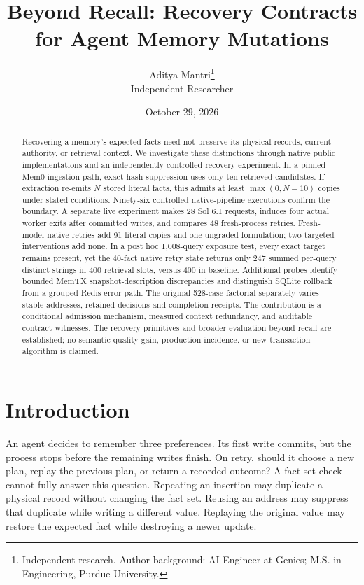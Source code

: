 \documentclass[10pt,letterpaper]{article}
\title{Beyond Recall: Recovery Contracts for Agent Memory Mutations}
\author{Aditya Mantri\thanks{Independent research. Author background: AI Engineer at Genies; M.S. in Engineering, Purdue University.}\\Independent Researcher}
\date{October 29, 2026}
\begin{document}
\maketitle
\begin{abstract}
Recovering a memory's expected facts need not preserve its physical records, current authority, or retrieval context. We investigate these distinctions through native public implementations and an independently controlled recovery experiment. In a pinned Mem0 ingestion path, exact-hash suppression uses only ten retrieved candidates. If extraction re-emits $N$ stored literal facts, this admits at least $\max(0,N-10)$ copies under stated conditions. Ninety-six controlled native-pipeline executions confirm the boundary. A separate live experiment makes 28 Sol 6.1 requests, induces four actual worker exits after committed writes, and compares 48 fresh-process retries. Fresh-model native retries add 91 literal copies and one ungraded formulation; two targeted interventions add none. In a post hoc 1,008-query exposure test, every exact target remains present, yet the 40-fact native retry state returns only 247 summed per-query distinct strings in 400 retrieval slots, versus 400 in baseline. Additional probes identify bounded MemTX snapshot-description discrepancies and distinguish SQLite rollback from a grouped Redis error path. The original 528-case factorial separately varies stable addresses, retained decisions and completion receipts. The contribution is a conditional admission mechanism, measured context redundancy, and auditable contract witnesses. The recovery primitives and broader evaluation beyond recall are established; no semantic-quality gain, production incidence, or new transaction algorithm is claimed.
\end{abstract}

\section{Introduction}
\label{sec:introduction}
An agent decides to remember three preferences. Its first write commits, but the process stops before the remaining writes finish. On retry, should it choose a new plan, replay the previous plan, or return a recorded outcome? A fact-set check cannot fully answer this question. Repeating an insertion may duplicate a physical record without changing the fact set. Reusing an address may suppress that duplicate while writing a different value. Replaying the original value may restore the expected fact while destroying a newer update.
\end{document}
